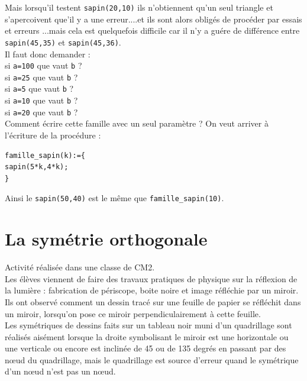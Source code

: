 \documentclass[a4paper,11pt]{book}
\begin{document}
Mais lorsqu'il testent {\tt sapin(20,10)} ils n'obtiennent qu'un seul triangle
et s'apercoivent que'il y a une erreur....et ils sont alors oblig\'es de 
proc\'eder par essais et erreurs ...mais cela est quelquefois difficile car il
n'y a gu\'ere de diff\'erence entre {\tt sapin(45,35)} et {\tt sapin(45,36)}.\\
Il faut donc demander :\\
si {\tt a=100} que vaut {\tt b} ?\\
si {\tt a=25} que vaut {\tt b} ?\\
si {\tt a=5} que vaut {\tt b} ?\\
si {\tt a=10} que vaut {\tt b} ?\\
si {\tt a=20} que vaut {\tt b} ?\\
Comment \'ecrire cette famille avec un seul param\`etre ?
On veut arriver  \`a l'\'ecriture de la proc\'edure :
\begin{verbatim}
famille_sapin(k):={
sapin(5*k,4*k);
}
\end{verbatim}
Ainsi le {\tt sapin(50,40)} est le m\^eme que {\tt famille\_sapin(10)}.

\section{La sym\'etrie orthogonale}
Activit\'e r\'ealis\'ee dans une classe de CM2.\\
Les \'el\`eves viennent de faire des travaux pratiques de physique sur la r\'eflexion de la lumi\`ere : fabrication de p\'eriscope, boite noire et image r\'efl\'echie par un miroir.\\
Ils ont observ\'e comment un dessin trac\'e sur une feuille de papier se 
r\'efl\'echit dans un miroir, lorsqu'on pose ce miroir perpendiculairement \`a 
cette feuille.\\
Les sym\'etriques de dessins faits sur un tableau noir muni d'un quadrillage
sont r\'ealis\'es ais\'ement lorsque la droite symbolisant le miroir est
une horizontale ou une verticale ou encore est inclin\'ee de 45 ou de 135
 degr\'es en passant par des n{\oe}ud du quadrillage, mais le quadrillage est 
source d'erreur quand  le sym\'etrique d'un n{\oe}ud n'est pas un n{\oe}ud.
\end{document}
